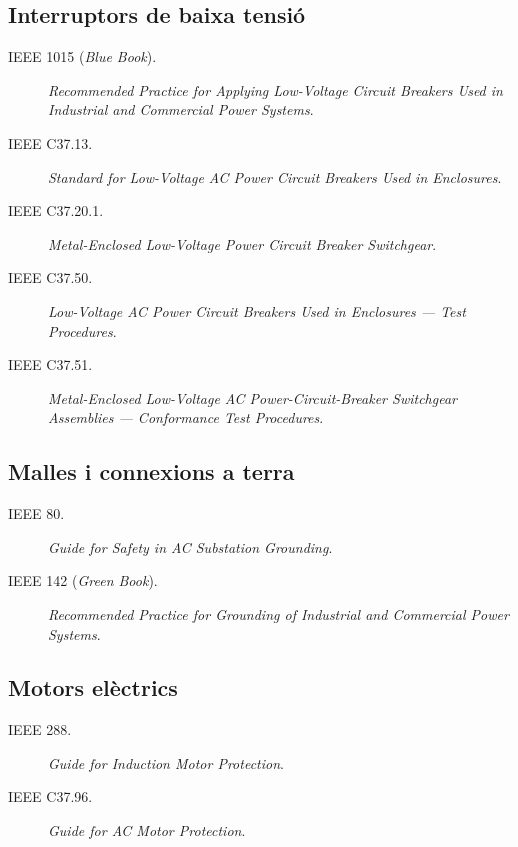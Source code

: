 \subsection*{Interruptors de baixa tensió}
\begin{description}
	\item [\hspace{5mm}IEEE 1015 (\textit{Blue Book}).] \textit{Recommended Practice for Applying Low-Voltage Circuit Breakers Used in Industrial and Commercial Power Systems}. 
     \item [\hspace{5mm}IEEE C37.13.] \textit{Standard for Low-Voltage AC Power Circuit Breakers Used in Enclosures}. 
    \item [\hspace{5mm}IEEE C37.20.1.] \textit{Metal-Enclosed Low-Voltage Power Circuit Breaker Switchgear}.
    \item [\hspace{5mm}IEEE C37.50.] \textit{Low-Voltage AC Power Circuit Breakers Used in Enclosures --- Test Procedures}.
    \item [\hspace{5mm}IEEE C37.51.] \textit{Metal-Enclosed Low-Voltage AC Power-Circuit-Breaker Switchgear Assemblies --- Conformance Test Procedures}.
\end{description}


\subsection*{Malles i connexions a terra}
\begin{description}
    \item [\hspace{5mm}IEEE 80.] \textit{Guide for Safety in AC Substation Grounding}.
    \item [\hspace{5mm}IEEE 142 (\textit{Green Book}).] \textit{Recommended Practice for Grounding of Industrial and Commercial Power Systems}.
\end{description}

\subsection*{Motors elèctrics}
\begin{description}
    \item [\hspace{5mm}IEEE 288.] \textit{Guide for Induction Motor Protection}.
    \item [\hspace{5mm}IEEE C37.96.] \textit{Guide for AC Motor Protection}.
\end{description}


